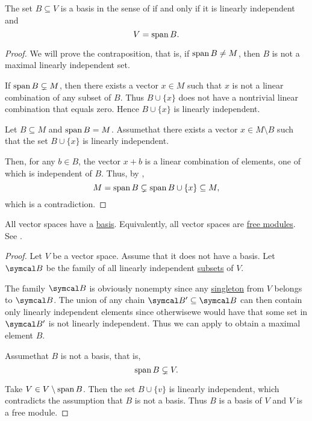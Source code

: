 \begin{Proposition}\label{thm:vector_space_basis}
  The set \( B \subseteq V \) is a basis in the sense of  if and only if it is linearly independent and
  \begin{equation*}
    V = \operatorname{span}{B}.
  \end{equation*}
\end{Proposition}
\begin{proof}
  \ISufficiency We will prove the contraposition, that is, if \( \operatorname{span}{B} \neq M \), then \( B \) is not a maximal linearly independent set.

  If \( \operatorname{span}{B} \subsetneq M \), then there exists a vector \( x \in M \) such that \( x \) is not a linear combination of any subset of \( B \). Thus \( B \cup \{ x \} \) does not have a nontrivial linear combination that equals zero. Hence \( B \cup \{ x \} \) is linearly independent.

  \INecessity Let \( B \subseteq M \) and \( \operatorname{span}{B} = M \). Assume\LEM that there exists a vector \( x \in M \setminus B \) such that the set \( B \cup \{ x \} \) is linearly independent.

  Then, for any \( b \in B \), the vector \( x + b \) is a linear combination of elements, one of which is independent of \( B \). Thus, by ,
  \begin{equation*}
    M = \operatorname{span}{B} \subsetneq \operatorname{span}{B \cup \{ x \}} \subseteq M,
  \end{equation*}
  which is a contradiction.
\end{proof}

\begin{Theorem}\label{thm:all_vector_spaces_are_free_left_modules}
  All vector spaces have a \hyperref[def:left_module_hamel_basis]{basis}. Equivalently, all vector spaces are \hyperref[def:free_left_module]{free modules}. See .
\end{Theorem}
\begin{proof}
  Let \( V \) be a vector space. Assume that it does not have a basis. Let \( \Cal{B} \) be the family of all linearly independent \hyperref[def:linear_combination]{subsets} of \( V \).

  The family \( \Cal{B} \) is obviously nonempty since any \hyperref[remark:singleton_sets]{singleton} from \( V \) belongs to \( \Cal{B} \). The union of any chain \( \Cal{B}' \subseteq \Cal{B} \) can then contain only linearly independent elements since otherwise\LEM we would have that some set in \( \Cal{B}' \) is not linearly independent. Thus we can apply  to obtain a maximal element \( B \).

  Assume\LEM that \( B \) is not a basis, that is,
  \begin{equation*}
    \operatorname{span} B \subsetneq V.
  \end{equation*}

  Take \( V \in V \setminus \operatorname{span} B \). Then the set \( B \cup \{ v \} \) is linearly independent, which contradicts the assumption that \( B \) is not a basis. Thus \( B \) is a basis of \( V \) and \( V \) is a free module.
\end{proof}


